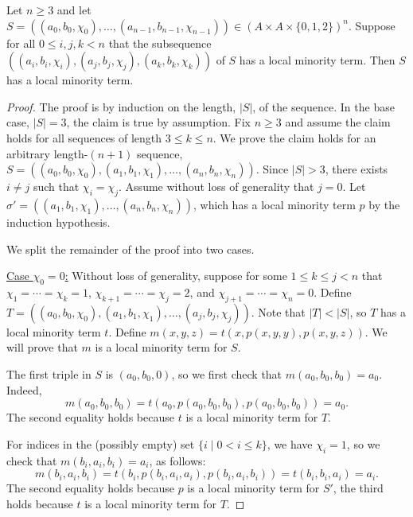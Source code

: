 \begin{thm}
  Let $n\geq 3$ and let
  $S  = ((a_0, b_0, \chi_0), \dots, (a_{n-1}, b_{n-1}, \chi_{n-1}))
  \in (A\times A \times \{0,1,2\})^n$.
  Suppose for all
  $0\leq i, j, k <n$ that the subsequence 
  $((a_i, b_i, \chi_i), (a_j, b_j, \chi_j), (a_k, b_k, \chi_k))$ of $S$ 
  has a local minority term.  Then $S$ has a local minority term.
\end{thm}
\begin{proof}
  The proof is by induction on the length, $|S|$, of the sequence.  In the base
  case, $|S| = 3$, the claim is true by assumption.
  Fix $n\geq 3$ and assume the claim holds for all sequences of length
  $3\leq k\leq n$.
  We prove the claim holds for an arbitrary length-$(n+1)$ sequence, 
  $S = ((a_0, b_0, \chi_0), (a_1, b_1, \chi_1), \dots, (a_{n}, b_{n}, \chi_{n}))$.
  Since $|S|>3$, there exists $i \neq j$ such that $\chi_i = \chi_j$.
  Assume without loss of generality that $j=0$.
  Let $\sigma' = ((a_1, b_1, \chi_1), \dots, (a_{n}, b_{n}, \chi_{n}))$, which
  has a local minority term $p$ by the induction hypothesis.

  We split the remainder of the proof into two cases.

  \vskip3mm

  \noindent \underline{Case $\chi_0 = 0$:}
  Without loss of generality, suppose for some $1\leq k \leq j < n$ that
  $\chi_1 =  \cdots =\chi_k = 1$,
  $\chi_{k+1}  = \cdots = \chi_{j} = 2$, and
  $\chi_{j+1} = \cdots = \chi_{n} = 0$.
  Define
  $T = ((a_0, b_0, \chi_0), (a_1, b_1, \chi_1), \dots, (a_j, b_j, \chi_j))$.
  Note that $|T| < |S|$, so $T$ has a local minority term $t$.
  Define
                $m(x,y,z) = t(x, p(x,y,y), p(x,y,z))$.
  We will prove that $m$ is a local minority term for $S$.

  The first triple in $S$ is $(a_0, b_0, 0)$, so we first check that
  $m(a_0,b_0,b_0)= a_0$. Indeed,
  \[
  m(a_0,b_0,b_0) = t(a_0, p(a_0, b_0, b_0), p(a_0, b_0, b_0)) = a_0.
  \]
  The second equality holds because $t$ is a local minority term for $T$.

  For indices in the (possibly empty) set $\{i \mid 0 < i \leq k\}$, we have
  $\chi_i = 1$, so we check that $m(b_i, a_i, b_i) = a_i$, as follows:
  \[
  m(b_i,a_i,b_i) = t(b_i, p(b_i, a_i, a_i), p(b_i, a_i, b_i)) = t(b_i, b_i, a_i)
  = a_i.
  \]
  The second equality holds because $p$ is a local minority term for $S'$, the
  third holds because $t$ is a local minority term for $T$.


\end{proof}
